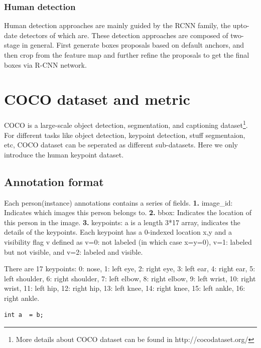 \subsubsection{Human detection}
Human detection approaches are mainly guided by the RCNN family\cite{girshick2014rich, girshick2015fast, ren2015faster}, the upto-date detectors of which are\cite{lin2017feature, he2017mask}.
These detection approaches are composed of two-stage in general.
First generate boxes proposals based on default anchors, and then crop from the feature map and further refine the proposals to get the final boxes via R-CNN network.


\section{COCO dataset and metric}

COCO\cite{lin2014microsoft} is a large-scale object detection, segmentation, and captioning dataset\footnote{More details about COCO dataset can be found in http://cocodataset.org/}.
For different tasks like object detection, keypoint detection, stuff segmentaion, etc, COCO dataset can be seperated as different sub-datasets.
Here we only introduce the human keypoint dataset.

\subsection{Annotation format}

Each person(instance) annotations contains a series of fields. \textbf{1.} image\_id: Indicates which images this person belongs to. \textbf{2.} bbox: Indicates the location of this person in the image.
\textbf{3.} keypoints: a is a length 3*17 array, indicates the details of the keypoints. Each keypoint has a 0-indexed location x,y and a visibility flag v defined as v=0: not labeled (in which case x=y=0), v=1: labeled but not visible, and v=2: labeled and visible.

There are 17 keypoints: 0: nose, 1: left eye, 2: right eye, 3: left ear, 4: right ear, 5: left shoulder, 6: right shoulder, 7: left elbow, 8: right elbow, 9: left wrist, 10: right wrist, 11: left hip, 12: right hip, 13: left knee, 14: right knee, 15: left ankle, 16: right ankle.

\begin{lstlisting}
int a  = b;
\end{lstlisting}



